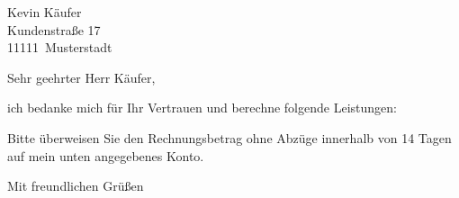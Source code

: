 \documentclass[version=last,fontsize=12pt,footheight=30mm,DIV=15]{scrlttr2}
\newcommand{\BuyerName}{Kevin Käufer}
\newcommand{\BuyerAddress}{Kundenstraße 17}
\newcommand{\BuyerPostcode}{11111}
\newcommand{\BuyerCity}{Musterstadt}
\begin{document}
  \begin{letter}{\BuyerName\\
      \BuyerAddress\\
      \BuyerPostcode\ \BuyerCity
    }
    \enlargethispage{6\baselineskip} %
    \opening{Sehr geehrter Herr Käufer,}

    ich bedanke mich für Ihr Vertrauen und berechne folgende Leistungen:


    \PrintInvoiceTabular

    \noindent Bitte überweisen Sie den Rechnungsbetrag ohne Abzüge innerhalb
    von 14 Tagen auf mein unten angegebenes Konto.
    \closing{Mit freundlichen Grüßen}
  \end{letter}
\end{document}
